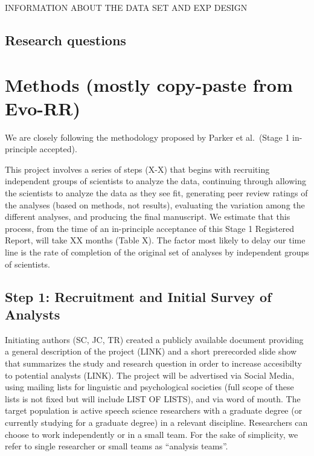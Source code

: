 \documentclass[
  english,
  man]{apa6}
\begin{document}
INFORMATION ABOUT THE DATA SET AND EXP DESIGN

\hypertarget{research-questions}{%
\subsection{Research questions}\label{research-questions}}

\hypertarget{methods-mostly-copy-paste-from-evo-rr}{%
\section{Methods (mostly copy-paste from Evo-RR)}\label{methods-mostly-copy-paste-from-evo-rr}}

We are closely following the methodology proposed by Parker et al.~(Stage 1 in-principle accepted).

This project involves a series of steps (X-X) that begins with recruiting independent groups of scientists to analyze the data, continuing through allowing the scientists to analyze the data as they see fit, generating peer review ratings of the analyses (based on methods, not results), evaluating the variation among the different analyses, and producing the final manuscript.
We estimate that this process, from the time of an in-principle acceptance of this Stage 1 Registered Report, will take XX months (Table X).
The factor most likely to delay our time line is the rate of completion of the original set of analyses by independent groups of scientists.

\hypertarget{step-1-recruitment-and-initial-survey-of-analysts}{%
\subsection{Step 1: Recruitment and Initial Survey of Analysts}\label{step-1-recruitment-and-initial-survey-of-analysts}}

Initiating authors (SC, JC, TR) created a publicly available document providing a general description of the project (LINK) and a short prerecorded slide show that summarizes the study and research question in order to increase accesibilty to potential analysts (LINK).
The project will be advertised via Social Media, using mailing lists for linguistic and psychological societies (full scope of these lists is not fixed but will include LIST OF LISTS), and via word of mouth.
The target population is active speech science researchers with a graduate degree (or currently studying for a graduate degree) in a relevant discipline.
Researchers can choose to work independently or in a small team.
For the sake of simplicity, we refer to single researcher or small teams as \enquote{analysis teams}.
\end{document}

